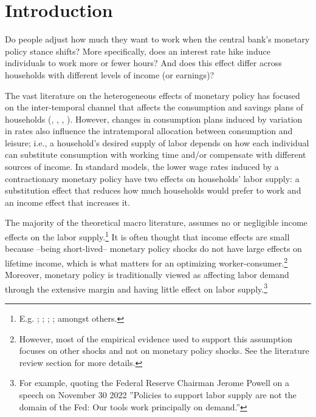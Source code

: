 \documentclass[a4paper,12pt]{article}%
\begin{document}
\section{Introduction}\label{T:Intro}

Do people adjust how much they want to work when the central bank's monetary policy stance shifts? More specifically, does an interest rate hike induce individuals to work more or fewer hours? And does this effect differ across households with different levels of income (or earnings)?


The vast literature on the heterogeneous effects of monetary policy has focused on the inter-temporal channel that affects the consumption and savings plans of households (\cite{Bilbiie:2008}, \cite{Auclert:19}, \cite{CFS:2020}, \cite{KMV:18}). However, changes in consumption plans induced by variation in rates also influence the intratemporal allocation between consumption and leisure; i.e., a household's desired supply of labor depends on how each individual can substitute consumption with working time and/or compensate with different sources of income. 
In standard models, the lower wage rates induced by a contractionary monetary policy have two effects on households' labor supply: a substitution effect that reduces how much households would prefer to work 
and an income effect that increases it.

The majority of the theoretical macro literature, assumes no or negligible income effects on the labor supply.\footnote{E.g. \citet{GSW12}; \citet{DP:2022}; \citet{Wolf:2019}; \citet{Auclert:2020}; amongst others.} It is often thought that income effects are small because --being short-lived-- monetary policy shocks do not have large effects on lifetime income, which is what matters for an optimizing worker-consumer.\footnote{However, most of the empirical evidence used to support this assumption focuses on other shocks and not on monetary policy shocks. See
the literature review section for more details.} 
Moreover, monetary policy is traditionally viewed as affecting labor demand through the extensive margin and having little effect on labor supply.\footnote{For example, quoting the Federal Reserve Chairman Jerome Powell on a speech on November 30 2022 ''Policies to support labor supply are not the domain of the Fed: Our tools work principally on demand.''} 
\end{document}

